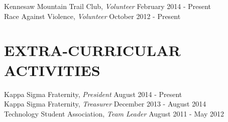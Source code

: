 \documentclass[margin, 10pt]{res} %
\begin{document}
\begin{resume}
Kennesaw Mountain Trail Club, {\sl Volunteer} \hfill February 2014 - Present \\
Race Against Violence, {\sl Volunteer} \hfill October 2012 - Present \\


\section{EXTRA-CURRICULAR \\ ACTIVITIES}

Kappa Sigma Fraternity, {\sl President} \hfill August 2014 - Present\\
Kappa Sigma Fraternity, {\sl Treasurer} \hfill December 2013 - August 2014 \\
Technology Student Association, {\sl Team Leader} \hfill August 2011 - May 2012 \\



\end{resume}
\end{document}
